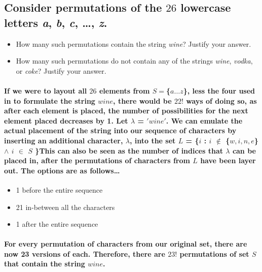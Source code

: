 \documentclass{amsart}
\theoremstyle{definition}
\theoremstyle{remark}
\numberwithin{equation}{section}
\begin{document}
\subsection*{
Consider permutations of the $26$ lowercase letters \emph{a}, \emph{b}, 
\emph{c}, \ldots, \emph{z}. }
\begin{itemize} 
\item How many such permutations contain the string \emph{wine}? 
      Justify your answer.   
\item How many such permutations do not contain any of the strings 
      \emph{wine}, \emph{vodka}, or \emph{coke}? 
      Justify your answer.   
\end{itemize} 

\paragraph{
	\newline
	If we were to layout all $26$ elements from $S= $\{${a\dots z}$\}, less the four used in to formulate the string $wine$, there would be $22!$ ways of doing so, as after each element is placed, the number of possibilities for the next element placed decreases by 1.\newline\newline
Let $\lambda$ = $'wine'$. \newline\newline We can emulate the actual placement of the string into our sequence of characters by inserting an additional character, $\lambda$, into the set $L$ =  \{$i$ : $i$ $\notin$ \{$w,i,n,e$\} $\land$ $i$ $\in$ $S$ \}\newline\newline This can also be seen as the number of indices that $\lambda$ can be placed in, after the permutations of characters from $L$ have been layer out. The options are as follows\dots \newline}
\begin{itemize}

  \item 1 before the entire sequence
  \item 21 in-between all the characters
  \item 1 after the entire sequence

\end{itemize}

\paragraph{
For every permutation of characters from our original set, there are now 23 versions of each. \textbf{Therefore, there are $23!$ permutations of set $S$ that contain the string $wine$}.
}
\end{document}

